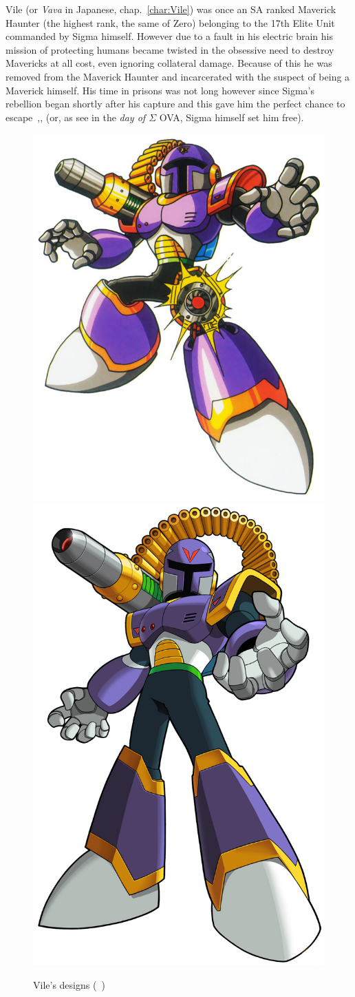 Vile (or \textit{Vava} in Japanese, chap.~\ref{char:Vile}) was once an SA ranked Maverick Haunter (the highest rank, the same of Zero) belonging to the 17th Elite Unit commanded by Sigma himself. However due to a fault in his electric brain his mission of protecting humans became twisted in the obsessive need to destroy Mavericks at all cost, even ignoring collateral damage. Because of this he was removed from the Maverick Haunter and incarcerated with the suspect of being a Maverick himself. His time in prisons was not long however since Sigma's rebellion began shortly after his capture and this gave him the perfect chance to escape~\cite{Xcoll1:Manual_X1},\cite{MHX:manual},\cite{wayback:X_resources} (or, as see in the \textit{day of $\Sigma$} OVA, Sigma himself set him free). 
\begin{figure}[htp]
	\centering
	\includegraphics[width=0.4\linewidth]{figures/X1/Sigma_stages/Vile.jpg}
	\includegraphics[width=0.35\linewidth]{figures/X1/Sigma_stages/MhxVile.png}
	\caption{Vile's designs (~\cite{book:MMX_Complete_art})}
\end{figure}
